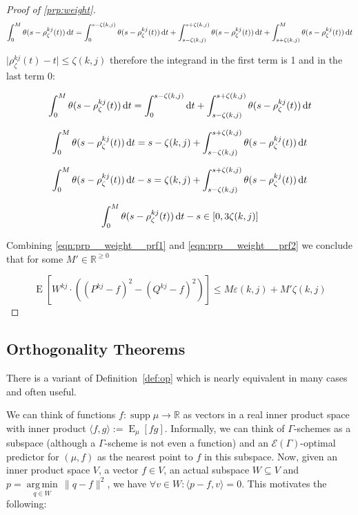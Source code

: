\documentclass{article}
\theoremstyle{definition}
\theoremstyle{plain}
\DeclareMathOperator{\Supp}{supp}
\DeclareMathOperator{\E}{E}
\newcommand{\Argmin}[1]{\underset{#1}{\operatorname{arg\,min}}\,}
\newcommand{\Reals}{\mathbb{R}}
\newcommand{\Abs}[1]{\lvert #1 \rvert}
\newcommand{\Norm}[1]{\lVert #1 \rVert}
\newcommand{\Chev}[1]{\langle #1 \rangle}
\begin{document}
\begin{proof}[Proof of \ref{prp:weight}]
$$\int_0^M \theta(s-\rho_\zeta^{kj}(t)) \dif t = \int_0^{s-\zeta(k,j)} \theta(s-\rho_\zeta^{kj}(t)) \dif t + \int_{s-\zeta(k,j)}^{s+\zeta(k,j)} \theta(s-\rho_\zeta^{kj}(t)) \dif t + \int_{s+\zeta(k,j)}^M \theta(s-\rho_\zeta^{kj}(t)) \dif t$$

$\Abs{\rho_\zeta^{kj}(t)-t} \leq \zeta(k,j)$ therefore the integrand in the first term is 1 and in the last term 0:

$$\int_0^M \theta(s-\rho_\zeta^{kj}(t)) \dif t = \int_0^{s-\zeta(k,j)} \dif t + \int_{s-\zeta(k,j)}^{s+\zeta(k,j)} \theta(s-\rho_\zeta^{kj}(t)) \dif t$$

$$\int_0^M \theta(s-\rho_\zeta^{kj}(t)) \dif t = s-\zeta(k,j) + \int_{s-\zeta(k,j)}^{s+\zeta(k,j)} \theta(s-\rho_\zeta^{kj}(t)) \dif t$$

$$\int_0^M \theta(s-\rho_\zeta^{kj}(t)) \dif t - s = \zeta(k,j) + \int_{s-\zeta(k,j)}^{s+\zeta(k,j)} \theta(s-\rho_\zeta^{kj}(t)) \dif t$$

\begin{equation}
\label{eqn:prp__weight__prf2}
\int_0^M \theta(s-\rho_\zeta^{kj}(t)) \dif t - s \in [0,3\zeta(k,j)]
\end{equation}

Combining \ref{eqn:prp__weight__prf1} and \ref{eqn:prp__weight__prf2} we conclude that for some $M' \in \Reals^{\geq 0}$

$$\E[W^{kj} \cdot ((P^{kj}-f)^2-(Q^{kj}-f)^2)] \leq M \varepsilon(k,j) + M'\zeta(k,j)$$

\end{proof}

\subsection{Orthogonality Theorems}

There is a variant of Definition~\ref{def:op} which is nearly equivalent in many cases and often useful.

We can think of functions $f: \Supp \mu \rightarrow \Reals$ as vectors in a real inner product space with inner product $\Chev{f,g}:=\E_\mu[fg]$. Informally, we can think of $\Gamma$-schemes as a subspace (although a $\Gamma$-scheme is not even a function) and an $\mathcal{E}(\Gamma)$-optimal predictor for $(\mu,f)$ as the nearest point to $f$ in this subspace. Now, given an inner product space $V$, a vector $f \in V$, an actual subspace $W \subseteq V$ and $p = \Argmin{q \in W} \Norm{q - f}^2$, we have $\forall v \in W: \Chev{p-f,v}=0$. This motivates the following:
\end{document}
